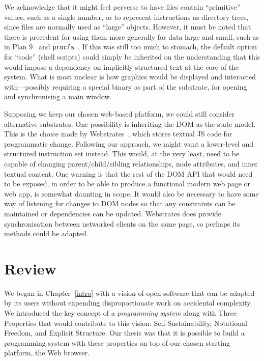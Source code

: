 \documentclass[ twoside,openright,titlepage,numbers=noenddot,headinclude,footinclude,cleardoublepage=empty,abstract=on,
                BCOR=5mm,paper=a4,fontsize=11pt
                ]{scrreprt}
\newcommand{\joel}[1]{}
\theoremstyle{definition}
\begin{document}
We acknowledge that it might feel perverse to have files contain
``primitive'' values, such as a single number, or to represent
instructions as directory trees, since files are normally used as
``large'' objects. However, it must be noted that there is precedent for
using them more generally for data large and small, such as in Plan
9~\parencite{Plan9} and \texttt{procfs}~\parencite{PAF}. If this was
still too much to stomach, the default option for ``code'' (shell
scripts) could simply be inherited on the understanding that this would
impose a dependency on implicitly-structured text at the core of the
system. What is most unclear is how graphics would be displayed and
interacted with---possibly requiring a special binary as part of the
substrate, for opening and synchronising a main window.

Supposing we keep our chosen web-based platform, we could still consider
alternative substrates. One possibility is inheriting the \ac{DOM} as
the state model. This is the choice made by
Webstrates~\parencite{Webstrates}, which stores textual \ac{JS} code for
programmatic change. Following our approach, we might want a lower-level
and structured instruction set instead. This would, at the very least,
need to be capable of changing parent/child/sibling relationships, node
attributes, and inner textual content. One warning is that the rest of
the \ac{DOM} API that would need to be exposed, in order to be able to
produce a functional modern web page or web app, is somewhat daunting in
scope. It would also be necessary to have some way of listening for
changes to \ac{DOM} nodes so that any constraints can be maintained or
dependencies can be updated. Webstrates does provide synchronisation
between networked clients on the same page, so perhaps its methods could
be adapted.

\joel{
We believe that, by identifying which parts of our journey ought to be transferrable to other contexts, it should be possible to develop a *general technique* for interactively bootstrapping self-sustainable systems from any starting platform.
}

\hypertarget{review}{\section{Review}\label{review}}

We began in Chapter~\ref{intro} with a vision of open software that can
be adapted by its users without expending disproportionate work on
accidental complexity. We introduced the key concept of a
\emph{programming system} along with Three Properties that would
contribute to this vision: Self-Sustainability, Notational Freedom, and
Explicit Structure. Our thesis was that it is possible to build a
programming system with these properties on top of our chosen starting
platform, the Web browser.
\end{document}
